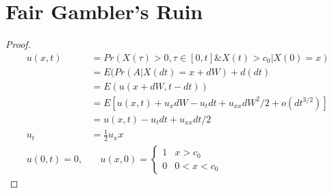 \documentclass{article}
\begin{document}
\maketitle 
\setlength{\parindent}{0pt}

\section{Fair Gambler's Ruin}
    \begin{proof}
        \begin{align*}
            u(x,t) &= Pr(X(\tau) > 0, \tau \in [0,t] \& X(t) > c_0 | X(0) =
            x)\\
            &= E(Pr(A | X(dt) = x + dW) + d(dt)\\
            &= E(u(x+dW, t-dt))\\
            &= E\left[u(x,t) + u_x dW - u_t dt + u_{xx}dW^2/2 +
            o(dt^{3/2})\right]\\
            &= u(x,t) - u_tdt + u_{xx}dt/2\\
            u_t &= \frac{1}{2}u_xx
            \\
            u(0,t) = 0, &\quad u(x,0) = \begin{cases}1 & x > c_0\\0 &
            0<x<c_0\end{cases}
        \end{align*}
    \end{proof}
\end{document}
